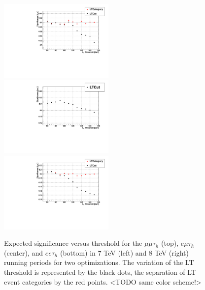 \begin{figure}
  \includegraphics[width=0.5\textwidth]{4_Analisys/pics/8TeV/limits/emt.pdf} \\
  \includegraphics[width=0.5\textwidth]{4_Analisys/pics/7TeV/limits/eet.pdf}
  \includegraphics[width=0.5\textwidth]{4_Analisys/pics/8TeV/limits/eet.pdf} \\
  \caption{Expected significance versus \LT threshold for the $\mu\mu\tau_h$ (top), $e\mu\tau_h$ (center), and $ee\tau_h$ (bottom) in 7 TeV (left) and 8 TeV (right) running periods for two optimizations. The variation of the LT threshold is represented by the black dots, the separation of LT event categories by the red points. <TODO same color scheme!>}
  \label{fig:eet_LT_scan}
\end{figure}

